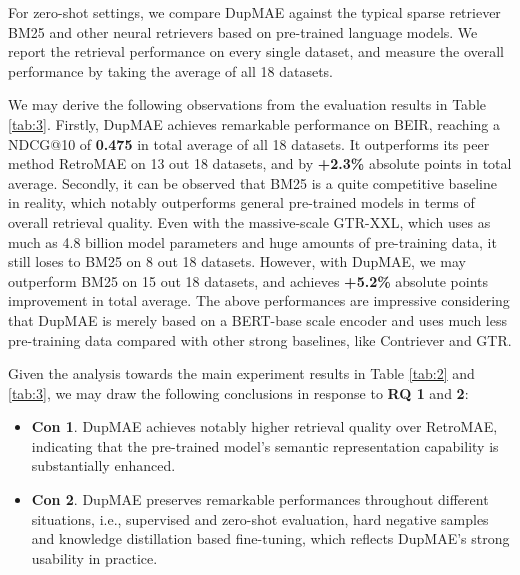 \documentclass[11pt,a4paper]{article}
\begin{document}
For zero-shot settings, we compare DupMAE against the typical sparse retriever BM25 and other neural retrievers based on pre-trained language models. We report the retrieval performance on every single dataset, and measure the overall performance by taking the average of all 18 datasets. 

We may derive the following observations from the evaluation results in Table \ref{tab:3}. Firstly, DupMAE achieves remarkable performance on BEIR, reaching a NDCG@10 of \textbf{0.475} in total average of all 18 datasets. It outperforms its peer method RetroMAE on 13 out 18 datasets, and by \textbf{+2.3\%} absolute points in total average. Secondly, it can be observed that BM25 is a quite competitive baseline in reality, which notably outperforms general pre-trained models in terms of overall retrieval quality. Even with the massive-scale GTR-XXL, which uses as much as 4.8 billion model parameters and huge amounts of pre-training data, it still loses to BM25 on 8 out 18 datasets. However, with DupMAE, we may outperform BM25 on 15 out 18 datasets, and achieves \textbf{+5.2\%} absolute points improvement in total average. The above performances are impressive considering that DupMAE is merely based on a BERT-base scale encoder and uses much less pre-training data compared with other strong baselines, like Contriever and GTR. 

Given the analysis towards the main experiment results in Table \ref{tab:2} and \ref{tab:3}, we may draw the following conclusions in response to \textbf{RQ 1} and \textbf{2}: 
\begin{itemize}
    \item \textbf{Con 1}. DupMAE achieves notably higher retrieval quality over RetroMAE, indicating that the pre-trained model's semantic representation capability is substantially enhanced. 
    \item \textbf{Con 2}. DupMAE preserves remarkable performances throughout different situations, i.e., supervised and zero-shot evaluation, hard negative samples and knowledge distillation based fine-tuning, which reflects DupMAE's strong usability in practice. 
\end{itemize} 
\end{document}
